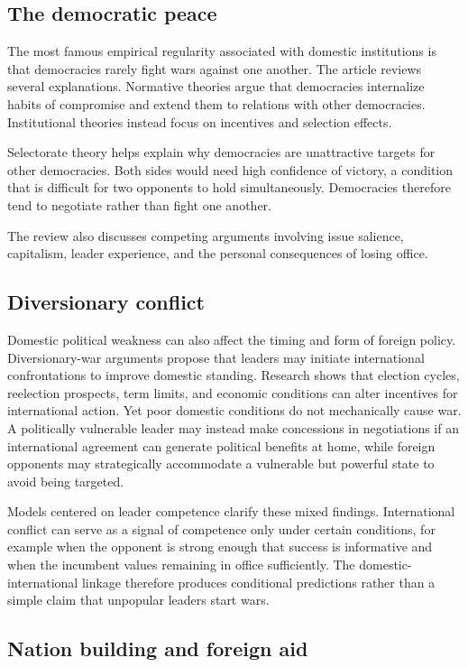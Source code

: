 \subsection{The democratic peace}

The most famous empirical regularity associated with domestic institutions is that democracies rarely fight wars against one another. The article reviews several explanations. Normative theories argue that democracies internalize habits of compromise and extend them to relations with other democracies. Institutional theories instead focus on incentives and selection effects.

Selectorate theory helps explain why democracies are unattractive targets for other democracies. Both sides would need high confidence of victory, a condition that is difficult for two opponents to hold simultaneously. Democracies therefore tend to negotiate rather than fight one another.

The review also discusses competing arguments involving issue salience, capitalism, leader experience, and the personal consequences of losing office.

\subsection{Diversionary conflict}

Domestic political weakness can also affect the timing and form of foreign policy. Diversionary-war arguments propose that leaders may initiate international confrontations to improve domestic standing. Research shows that election cycles, reelection prospects, term limits, and economic conditions can alter incentives for international action. Yet poor domestic conditions do not mechanically cause war. A politically vulnerable leader may instead make concessions in negotiations if an international agreement can generate political benefits at home, while foreign opponents may strategically accommodate a vulnerable but powerful state to avoid being targeted.

Models centered on leader competence clarify these mixed findings. International conflict can serve as a signal of competence only under certain conditions, for example when the opponent is strong enough that success is informative and when the incumbent values remaining in office sufficiently. The domestic-international linkage therefore produces conditional predictions rather than a simple claim that unpopular leaders start wars.

\subsection{Nation building and foreign aid}

